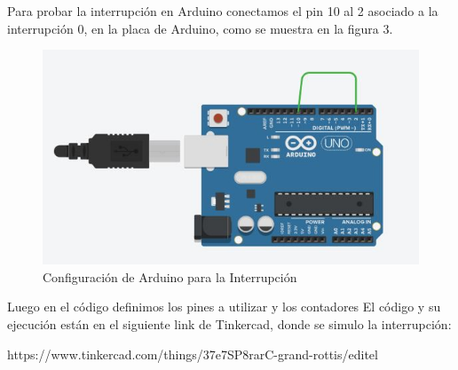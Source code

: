 \documentclass{article}
\begin{document}
Para probar la interrupción en Arduino conectamos el pin 10 al 2 asociado a la interrupción 0, en la placa de Arduino, como se muestra en la figura 3.

\begin{figure}[h]
\centering
\includegraphics[scale=0.5]{interrupcionA}
\caption{Configuración de Arduino para la Interrupción}
\label{fig:interrupcionA}
\end{figure}

Luego en el código definimos los pines a utilizar y los contadores
El código y su ejecución están en el siguiente link de Tinkercad, donde se simulo la interrupción:

https://www.tinkercad.com/things/37e7SP8rarC-grand-rottis/editel 



\end{document}
